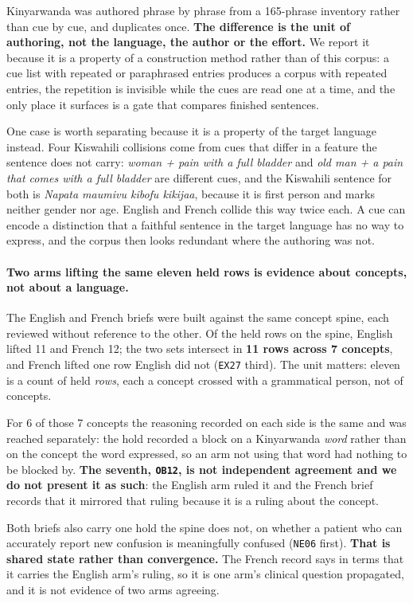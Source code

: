 Kinyarwanda was authored phrase by phrase from a 165-phrase inventory rather
than cue by cue, and duplicates once. \textbf{The difference is the unit of
authoring, not the language, the author or the effort.} We report it because it
is a property of a construction method rather than of this corpus: a cue list
with repeated or paraphrased entries produces a corpus with repeated entries,
the repetition is invisible while the cues are read one at a time, and the only
place it surfaces is a gate that compares finished sentences.

One case is worth separating because it is a property of the target language
instead. Four Kiswahili collisions come from cues that differ in a feature the
sentence does not carry: \emph{woman + pain with a full bladder} and
\emph{old man + a pain that comes with a full bladder} are different cues, and
the Kiswahili sentence for both is \emph{Napata maumivu kibofu kikijaa}, because
it is first person and marks neither gender nor age. English and French collide
this way twice each. A cue can encode a distinction that a faithful sentence in
the target language has no way to express, and the corpus then looks redundant
where the authoring was not.

\paragraph{Two arms lifting the same eleven held rows is evidence about
concepts, not about a language.} The English and French briefs were built
against the same concept spine, each reviewed without reference to the other.
Of the \CorpusHeld{} held rows on the spine, English lifted 11 and French 12;
the two sets intersect in \textbf{11 rows across 7 concepts}, and French lifted
one row English did not (\texttt{EX27} third). The unit matters: eleven is a
count of held \emph{rows}, each a concept crossed with a grammatical person, not
of concepts.

For 6 of those 7 concepts the reasoning recorded on each side is the same and
was reached separately: the hold recorded a block on a Kinyarwanda \emph{word}
rather than on the concept the word expressed, so an arm not using that word had
nothing to be blocked by. \textbf{The seventh, \texttt{OB12}, is not independent
agreement and we do not present it as such}: the English arm ruled it and the
French brief records that it mirrored that ruling because it is a ruling about
the concept.

Both briefs also carry one hold the spine does not, on whether a patient who can
accurately report new confusion is meaningfully confused (\texttt{NE06} first).
\textbf{That is shared state rather than convergence.} The French record says in
terms that it carries the English arm's ruling, so it is one arm's clinical
question propagated, and it is not evidence of two arms agreeing.

